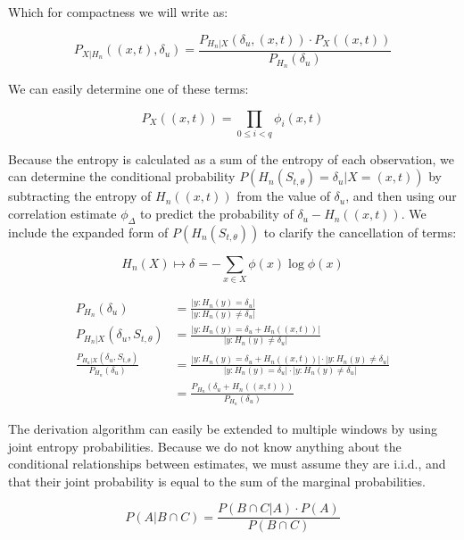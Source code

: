 \documentclass[10pt]{article}
\begin{document}
Which for compactness we will write as:

\begin{equation} P_{X|H_n} \left( (x,t), \delta_u \right) = \frac { P_{H_n|X} \left( \delta_u, (x,t) \right) \cdot P_X \left( (x,t) \right) } { P_{H_n} \left( \delta_u \right) } \end{equation}

We can easily determine one of these terms:

\begin{equation} P_X \left( (x,t) \right) = \prod_{0 \le i < q} \phi_i(x,t) \end{equation}

Because the entropy is calculated as a sum of the entropy of each observation, we can determine the conditional probability \( P \left( H_n(S_{t,\theta}) = \delta_u | X = (x,t) \right) \) by subtracting the entropy of \(H_n((x,t)) \) from the value of \(\delta_u \), and then using our correlation estimate \(\phi_\Delta \) to predict the probability of \(\delta_u - H_n((x,t)) \).  We include the expanded form of \(P( H_n(S_{t,\theta}) ) \) to clarify the cancellation of terms:

\[ H_n(X) \mapsto \delta= -\sum_{x \in X} \phi(x) \log \phi(x) \]

\begin{align*}
P_{H_n} \left( \delta_u \right) &= \frac{ | y : H_n(y) = \delta_u | }{ | y : H_n(y) \ne \delta_u | } \\
P_{H_n |X} \left( \delta_u, S_{t,\theta} \right) &= \frac{ | y : H_n(y) = \delta_u + H_n \left( (x,t) \right) | }{ | y : H_n (y) \ne \delta_u | } \\
\frac{ P_{H_n |X} \left( \delta_u, S_{t,\theta} \right) }{ P_{H_n}( \delta_u ) } &= \frac{ | y : H_n(y) = \delta_u + H_n \left( (x,t) \right) | \cdot | y : H_n(y) \ne \delta_u | }
{ | y : H_n(y) = \delta_u | \cdot | y : H_n(y) \ne \delta_u | } \\
&= \frac{ P_{H_n} \left( \delta_u + H_n \left( (x,t) \right) \right) }{ P_{H_n} \left( \delta_u \right) } 
\end{align*}

The derivation algorithm can easily be extended to multiple windows by using joint entropy probabilities.  Because we do not know anything about the conditional relationships between estimates, we must assume they are i.i.d., and that their joint probability is equal to the sum of the marginal probabilities.


\[ P(A|B \cap C) = \frac{ P(B \cap C|A) \cdot P(A) }{ P(B \cap C) } \]
\end{document}

